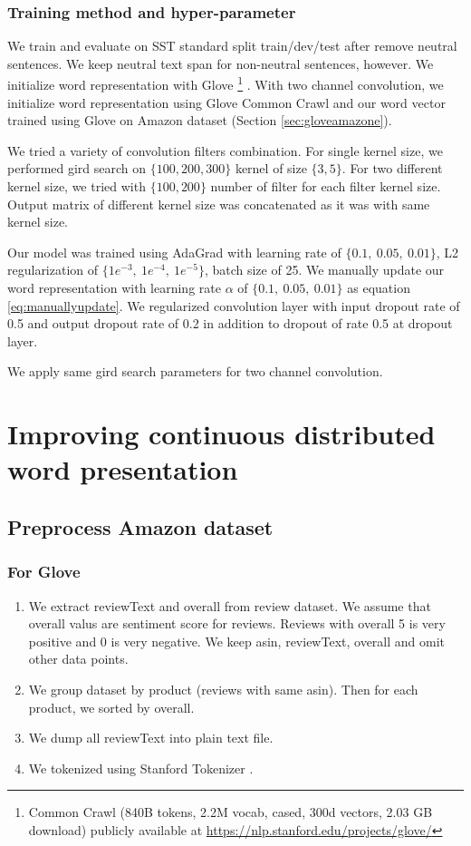 \subsubsection{Training method and hyper-parameter}
We train and evaluate on SST standard split train/dev/test after remove neutral sentences. We keep neutral text span for non-neutral sentences, however. We initialize word representation with Glove \footnote{\label{glovecommoncrawl}Common Crawl (840B tokens, 2.2M vocab, cased, 300d vectors, 2.03 GB download) publicly available at \url{https://nlp.stanford.edu/projects/glove/}} \cite{glove}. With two channel convolution, we initialize word representation using Glove Common Crawl and our word vector trained using Glove on Amazon dataset (Section \ref{sec:gloveamazone}). 

We tried a variety of convolution filters combination. For single kernel size, we performed gird search on $\{100, 200, 300\}$ kernel of size $\{3, 5\}$. For two different kernel size, we tried with $\{100, 200\}$ number of filter for each filter kernel size. Output matrix of different kernel size was concatenated as it was with same kernel size. 

Our model was trained using AdaGrad \cite{duchi2011adaptive} with learning rate of $\{0.1,~ 0.05,~ 0.01\}$, L2 regularization of $\{1e^{-3},~ 1e^{-4}, ~ 1e^{-5} \}$, batch size of 25. We manually update our word representation with learning rate $\alpha$ of $\{0.1,~0.05, ~0.01\}$ as equation \ref{eq:manuallyupdate}. We regularized convolution layer with input dropout rate of 0.5 and output dropout rate of 0.2 in addition to dropout of rate 0.5 at dropout layer. 

We apply same gird search parameters for two channel convolution. 


\section{Improving continuous distributed word presentation} \label{sec:improveembedding}

\subsection{Preprocess Amazon dataset}
\subsubsection{For Glove}\label{sec:preprocessamazonglove}

\begin{enumerate}
	\item We extract reviewText and overall from review dataset. We assume that overall valus are sentiment score for reviews. Reviews with overall 5 is very positive and 0 is very negative. We keep asin, reviewText, overall and omit other data points.
	\item We group dataset by product (reviews with same asin). Then for each product, we sorted by overall.
	\item We dump all reviewText into plain text file.
	\item We tokenized using Stanford Tokenizer \cite{tokenizerpart}.
\end{enumerate}

